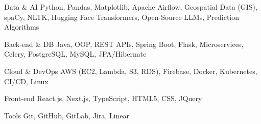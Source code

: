

\begin{cvskills}

  \cvskill
    {Data \& AI} %
    {Python, Pandas, Matplotlib, Apache Airflow, Geospatial Data (GIS), spaCy, NLTK, Hugging Face Transformers, Open-Source LLMs, Prediction Algorithms} %

  \cvskill
    {Back-end \& DB} %
    {Java, OOP, REST APIs, Spring Boot, Flask, Microservices, Celery, PostgreSQL, MySQL, JPA/Hibernate} %

  \cvskill
    {Cloud \& DevOps} %
    {AWS (EC2, Lambda, S3, RDS), Firebase, Docker, Kubernetes, CI/CD, Linux} %

  \cvskill
    {Front-end} %
    {React.js, Next.js, TypeScript, HTML5, CSS, JQuery} %

  \cvskill
    {Tools } %
    {Git, GitHub, GitLab, Jira, Linear} %

\end{cvskills}